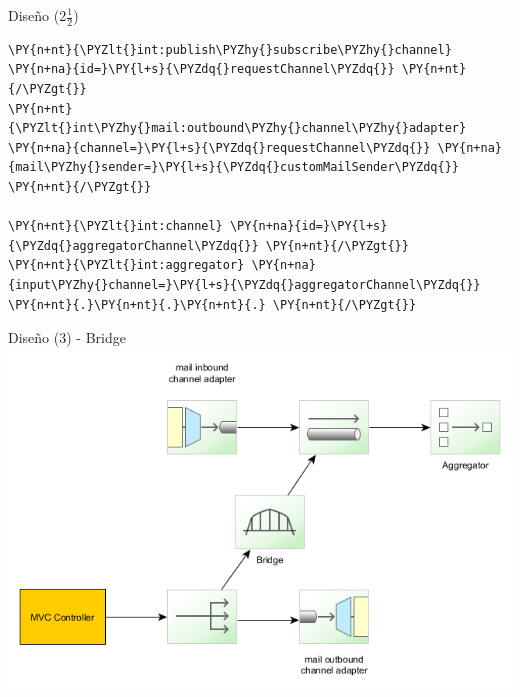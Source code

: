 \documentclass{beamer}
\begin{document}
\begin{frame}[fragile]{Diseño (2$\frac{1}{2}$)}
\begin{Verbatim}[fontsize=\tiny,commandchars=\\\{\}]
\PY{n+nt}{\PYZlt{}int:publish\PYZhy{}subscribe\PYZhy{}channel} \PY{n+na}{id=}\PY{l+s}{\PYZdq{}requestChannel\PYZdq{}} \PY{n+nt}{/\PYZgt{}}
\PY{n+nt}{\PYZlt{}int\PYZhy{}mail:outbound\PYZhy{}channel\PYZhy{}adapter} \PY{n+na}{channel=}\PY{l+s}{\PYZdq{}requestChannel\PYZdq{}} \PY{n+na}{mail\PYZhy{}sender=}\PY{l+s}{\PYZdq{}customMailSender\PYZdq{}} \PY{n+nt}{/\PYZgt{}}

\PY{n+nt}{\PYZlt{}int:channel} \PY{n+na}{id=}\PY{l+s}{\PYZdq{}aggregatorChannel\PYZdq{}} \PY{n+nt}{/\PYZgt{}}
\PY{n+nt}{\PYZlt{}int:aggregator} \PY{n+na}{input\PYZhy{}channel=}\PY{l+s}{\PYZdq{}aggregatorChannel\PYZdq{}} \PY{n+nt}{.}\PY{n+nt}{.}\PY{n+nt}{.} \PY{n+nt}{/\PYZgt{}}
\end{Verbatim}
\end{frame}


\begin{frame}{Diseño (3) - Bridge}
\includegraphics[width=1.0\linewidth]{sp-int-06}
\end{frame}
\end{document}
